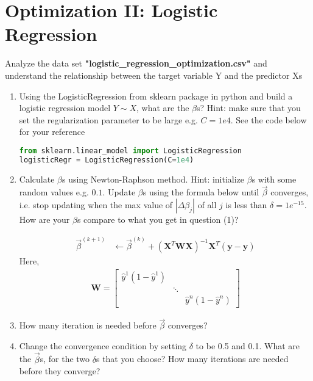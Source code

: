 \documentclass{article}
\begin{document}
\section{Optimization II: Logistic Regression} %
Analyze the data set \textbf{"logistic\_regression\_optimization.csv"} and understand the relationship between the target variable Y and the predictor Xs

\begin{enumerate}[(1)]
\item Using the LogisticRegression from sklearn package in python and build a logistic regression model $Y\sim X$, what are the $\beta$s? Hint: make sure that you set the regularization parameter to be large e.g. $C=1e4$. See the code below for your reference
\begin{lstlisting}[language=Python]
from sklearn.linear_model import LogisticRegression
logisticRegr = LogisticRegression(C=1e4)
\end{lstlisting}

\item Calculate $\beta$s using Newton-Raphson method. Hint: initialize $\beta$s with some random values e.g. $0.1$. Update $\beta$s using the formula below until $\vec{\beta}$ converges, i.e. stop updating when the max value of $|\Delta {\beta_j}|$ of all $j$ is less than $\delta=1e^{-15}$. How are your $\beta$s compare to what you get in question (1)?

\begin{align*}
\vec{\beta}^{(k+1)} &\leftarrow \vec{\beta}^{(k)}+(\textbf{X}^T\textbf{W}\textbf{X})^{-1}\textbf{X}^T(\textbf{y}-\hat{\textbf{y}})
\end{align*}
Here,
\begin{align*}
\textbf{W}=  \begin{bmatrix}
    \hat{y}^1 (1-\hat{y}^1) & & \\
    & \ddots & \\
    & & \hat{y}^n (1-\hat{y}^n)
  \end{bmatrix}
\end{align*}

\item How many iteration is needed before  $\vec{\beta}$ converges?

\item Change the convergence condition by setting $\delta$ to be 0.5 and 0.1. What are the $\vec{\beta}$s, for the two $\delta$s that you choose? How many iterations are needed before they converge?
\end{enumerate}
\end{document}
